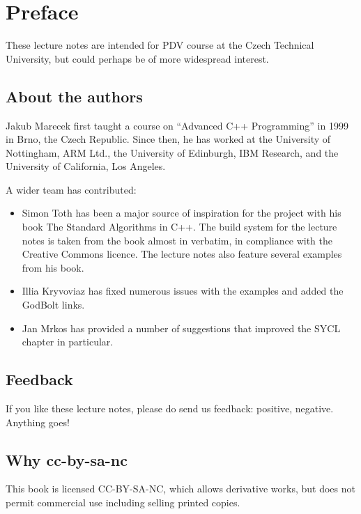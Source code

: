 \chapter{Preface}

These lecture notes are intended for PDV course at the Czech Technical University, but could perhaps be of more widespread interest. 

\section*{About the authors}

Jakub Marecek first taught a course on ``Advanced C++ Programming'' in 1999 in Brno, the Czech Republic. Since then, he has worked at the University of Nottingham, ARM Ltd., the University of Edinburgh, IBM Research, and the University of California, Los Angeles.

A wider team has contributed:
\begin{itemize}
\item Simon Toth has been a major source of inspiration for the project with his book The Standard Algorithms in C++. The build system for the lecture notes is taken from the book almost in verbatim, in compliance with the Creative Commons licence. The lecture notes also feature several examples from his book. 
\item Illia Kryvoviaz has fixed numerous issues with the examples and added the GodBolt links. 
\item Jan Mrkos has provided a number of suggestions that improved the SYCL chapter in particular. 
\end{itemize}

\section*{Feedback}

If you like these lecture notes, please do send us feedback: positive, negative. Anything goes!

\section*{Why cc-by-sa-nc}

This book is licensed CC-BY-SA-NC, which allows derivative works, but does not permit commercial use including selling printed copies. 